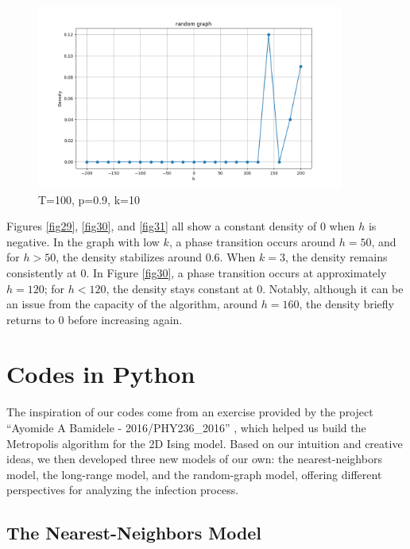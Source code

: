 \documentclass[11pt]{book}
\begin{document}
\begin{figure}
    \begin{minipage}{0.45\textwidth}
        \centering
        \includegraphics[width=0.9\textwidth]{rg,T=100,p=0.9,k=10.png} %
        \caption{T=100, p=0.9, k=10}
        \label{fig31}
    \end{minipage}\hfill
\end{figure}

Figures \eqref{fig29}, \eqref{fig30}, and \eqref{fig31} all show a constant density of $0$ when $h$ is negative. In the graph with low $k$, a phase transition occurs around $h=50$, and for $h>50$, the density stabilizes around $0.6$. When $k=3$, the density remains consistently at $0$. In Figure \eqref{fig30}, a phase transition occurs at approximately $h=120$; for $h<120$, the density stays constant at $0$. Notably, although it can be an issue from the capacity of the algorithm, around $h=160$, the density briefly returns to $0$ before increasing again.

\chapter{Codes in Python}

The inspiration of our codes come from an exercise provided by the project “Ayomide A Bamidele - 2016/PHY236\_2016” \cite{Bamidele}, which helped us build the Metropolis algorithm for the 2D Ising model. Based on our intuition and creative ideas, we then developed three new models of our own: the nearest-neighbors model, the long-range model, and the random-graph model, offering different perspectives for analyzing the infection process.

\section{The Nearest-Neighbors Model}
\end{document}
